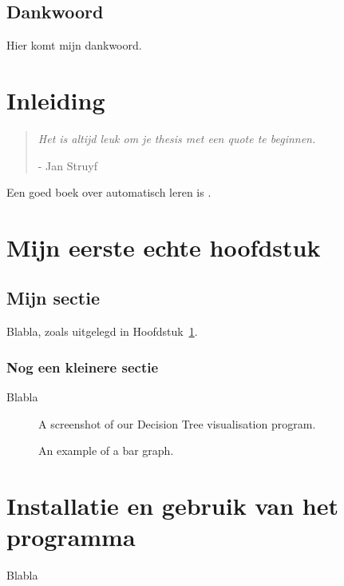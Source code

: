 \documentclass[dutch,12pt,oneside,a4paper]{book}
\newcommand{\phantomsection}{}
\newcommand{\includebitmap}[1]{\texttt{[image: \#1]}}
\newcommand{\includebitmap}[1]{\texttt{[image: \#1.png]}}
\begin{document}


\cleardoublepage
\section*{Dankwoord}

Hier komt mijn dankwoord.

\newpage
\tableofcontents

\newpage
\mainmatter
\chapter{Inleiding}
\label{inleiding:chap}
\begin{quote}
{{\small\it Het is altijd leuk om je thesis met een quote te beginnen.}}

{{\small\sc - Jan Struyf}}
\end{quote}
\medskip

Een goed boek over automatisch leren is \cite{mitchell:book}.

\chapter {Mijn eerste echte hoofdstuk}

\section{Mijn sectie}

Blabla, zoals uitgelegd in Hoofdstuk~\ref{inleiding:chap}.

\subsection{Nog een kleinere sectie}

Blabla

\begin{figure}
\framebox{\resizebox{\textwidth}{!}{\includebitmap{fig/dectree}}}
\caption{\label{dectree:fig}A screenshot of our Decision Tree visualisation program.}
\end{figure}

\begin{figure}
\caption{\label{bar:fig}An example of a bar graph.}
\end{figure}

\cleardoublepage{}\phantomsection{}
\appendix
\chapter{Installatie en gebruik van het programma}

Blabla

\backmatter
{}



\listoffigures
{}
\listoftables
\end{document}
